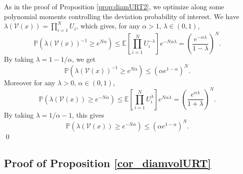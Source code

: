 \documentclass[paper=a4, fontsize=11pt]{scrartcl}
\newcommand{\PP}{\mathbb{P}}
\newcommand{\EE}{\mathbb{E}}
\begin{document}
As in the proof of Proposition \ref{prop:diamURT2}, we optimize along some polynomial moments controlling the deviation probability of interest. We have $\lambda(\mathcal V(x))=\prod_{i=1}^N U_i$, which gives, for any $\alpha>1$, $\lambda \in (0,1)$,
\[
\PP(\lambda(\mathcal V(x))^{-1}\geq e^{N\alpha})\leq \EE\left[\prod_{i=1}^N U_i^{-\lambda}\right]e^{-N\alpha \lambda} = \left(\frac{e^{-\alpha \lambda}}{1-\lambda}\right)^N.
\]
By taking $\lambda =1 -1/\alpha$, we get
\[
\PP(\lambda(\mathcal V(x))^{-1}\geq e^{N\alpha})\leq (\alpha e^{1-\alpha})^N.
\]
Moreover for any $\lambda>0$, $\alpha \in (0,1)$,
\[
\PP(\lambda(\mathcal V(x)) \geq e^{-N\alpha})\leq \EE\left[\prod_{i=1}^N U_i^{\lambda}\right]e^{N\alpha \lambda} = \left(\frac{e^{\alpha \lambda}}{1+\lambda}\right)^N.
\]
By taking $\lambda =1/\alpha - 1$, this gives
\[
\PP(\lambda(\mathcal V(x))\geq e^{-N\alpha})\leq (\alpha e^{1-\alpha})^N.
\]
\qed

\subsection*{Proof of Proposition \ref{cor_diamvolURT}}
\end{document}
